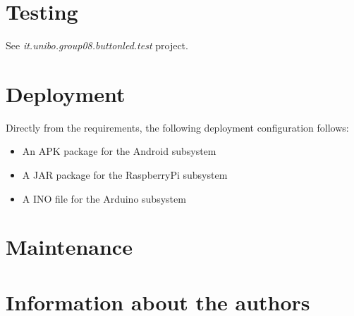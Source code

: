 \documentclass{article}
\newcommand{\labelsec}[1]{\label{sec:#1}}
\begin{document}
\section{Testing}
\labelsec{testing}

 See \emph{it.unibo.group08.buttonled.test} project.

\section{Deployment}
\labelsec{Deployment}

 Directly from the requirements, the following deployment configuration follows:
 
 \begin{itemize}
   \item An APK package for the Android subsystem
   \item A JAR package for the RaspberryPi subsystem
   \item A INO file for the Arduino subsystem
 \end{itemize}

\section{Maintenance}
\labelsec{Maintenance}


\section{Information about the authors}
\labelsec{Author}
\end{document}
